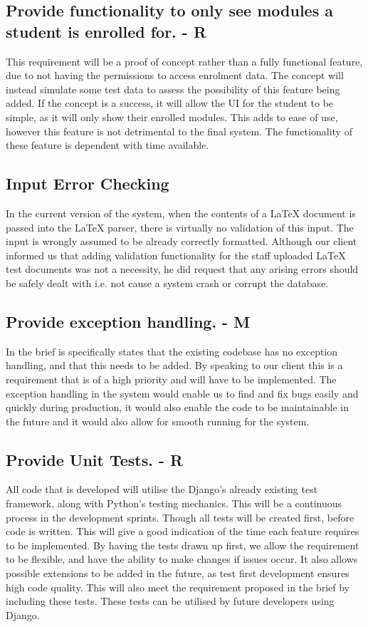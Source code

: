 \documentclass[12pt]{article}
\begin{document}
	\subsection{Provide functionality to only see modules a student is enrolled for. - R}
	This requirement will be a proof of concept rather than a fully functional feature, due to not having the permissions to access enrolment data. The concept will instead simulate some test data to assess the possibility of this feature being added. If the concept is a success, it will allow the UI for the student to be simple, as it will only show their enrolled modules. This adds to ease of use, however this feature is not detrimental to the final system. The functionality of these feature is dependent with time available.
	\subsection{Input Error Checking}
	In the current version of the system, when the contents of a LaTeX document is passed into the LaTeX parser, there is virtually no validation of this input. The input is wrongly assumed to be already correctly formatted. Although our client informed us that adding validation functionality for the staff uploaded LaTeX test documents was not a necessity, he did request that any arising errors should be safely dealt with i.e. not cause a system crash or corrupt the database.
	\subsection{Provide exception handling. - M}
	In the brief is specifically states that the existing codebase has no exception handling, and that this needs to be added. By speaking to our client this is a requirement that is of a high priority and will have to be implemented.
The exception handling in the system would enable us to find and fix bugs easily and quickly during production, it would also enable the code to be maintainable in the future and it would also allow for smooth running for the system.

	\subsection{Provide Unit Tests. - R}
	All code that is developed will utilise the Django’s already existing test framework, along with Python’s testing mechanics. This will be a continuous process in the development sprints. Though all tests will be created first, before code is written. This will give a good indication of the time each feature requires to be implemented. By having the tests drawn up first, we allow the requirement to be flexible, and have the ability to make changes if issues occur. It also allows possible extensions to be added in the future, as test first development ensures high code quality. This will also meet the requirement proposed in the brief by including these tests. These tests can be utilised by future developers using Django.
\end{document}
